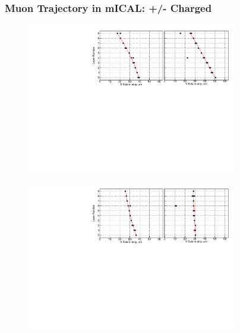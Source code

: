 \documentclass{beamer}
\begin{document}
\begin{frame}
  \frametitle{Muon Trajectory in mICAL: +/- Charged}
  \vspace*{-5pt}
  \begin{figure}[h!]
    \includegraphics[width=0.82\textwidth]{Event_SNM_BRPCv4t_evtraw_20181212_091647_000157_1.pdf}
  \end{figure}
  \vspace*{-15pt}
  \begin{figure}[h!]
    \includegraphics[width=0.82\textwidth]{Event_SNM_BRPCv4t_evtraw_20181212_091647_000045_1.pdf}
  \end{figure}
\end{frame}
\end{document}
